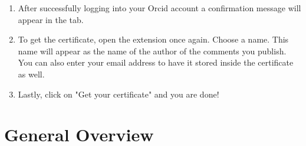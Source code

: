 \documentclass{article}
\begin{document}
\begin{enumerate}
\begin{figure}[H]
        \end{figure}
    \item After successfully logging into your Orcid account a confirmation message will appear in the tab.
    \item To get the certificate, open the extension once again. Choose a name. This name will appear as the name of the author of the comments you publish. You can also enter your email address to have it stored inside the certificate as well.
    \item Lastly, click on "Get your certificate" and you are done!
\end{enumerate}

\section{General Overview}
\end{document}
